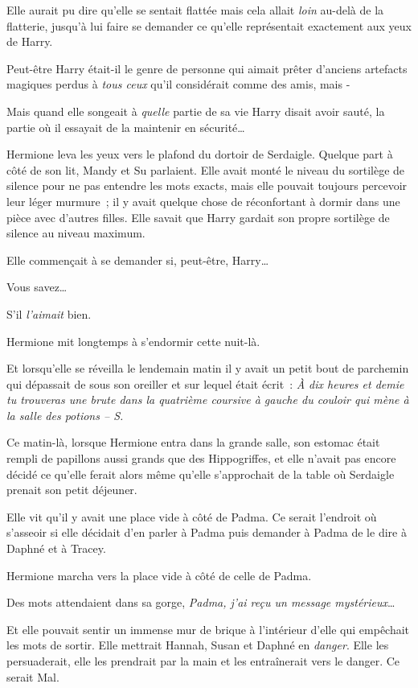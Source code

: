 Elle aurait pu dire qu'elle se sentait flattée mais cela allait \emph{loin} au-delà de la flatterie, jusqu'à lui faire se demander ce qu'elle représentait exactement aux yeux de Harry.

Peut-être Harry était-il le genre de personne qui aimait prêter d'anciens artefacts magiques perdus à \emph{tous ceux} qu'il considérait comme des amis, mais -

Mais quand elle songeait à \emph{quelle} partie de sa vie Harry disait avoir sauté, la partie où il essayait de la maintenir en sécurité…

Hermione leva les yeux vers le plafond du dortoir de Serdaigle. Quelque part à côté de son lit, Mandy et Su parlaient. Elle avait monté le niveau du sortilège de silence pour ne pas entendre les mots exacts, mais elle pouvait toujours percevoir leur léger murmure~; il y avait quelque chose de réconfortant à dormir dans une pièce avec d'autres filles. Elle savait que Harry gardait son propre sortilège de silence au niveau maximum.

Elle commençait à se demander si, peut-être, Harry…

Vous savez…

S'il \emph{l'aimait} bien.

Hermione mit longtemps à s'endormir cette nuit-là.

Et lorsqu'elle se réveilla le lendemain matin il y avait un petit bout de parchemin qui dépassait de sous son oreiller et sur lequel était écrit~: \emph{À dix heures et demie tu trouveras une brute dans la quatrième coursive à gauche du couloir qui mène à la salle des potions -- S.}

\later

Ce matin-là, lorsque Hermione entra dans la grande salle, son estomac était rempli de papillons aussi grands que des Hippogriffes, et elle n'avait pas encore décidé ce qu'elle ferait alors même qu'elle s'approchait de la table où Serdaigle prenait son petit déjeuner.

Elle vit qu'il y avait une place vide à côté de Padma. Ce serait l'endroit où s'asseoir si elle décidait d'en parler à Padma puis demander à Padma de le dire à Daphné et à Tracey.

Hermione marcha vers la place vide à côté de celle de Padma.

Des mots attendaient dans sa gorge, \emph{Padma, j'ai reçu un message mystérieux}…

Et elle pouvait sentir un immense mur de brique à l'intérieur d'elle qui empêchait les mots de sortir. Elle mettrait Hannah, Susan et Daphné en \emph{danger}. Elle les persuaderait, elle les prendrait par la main et les entraînerait vers le danger. Ce serait Mal.

